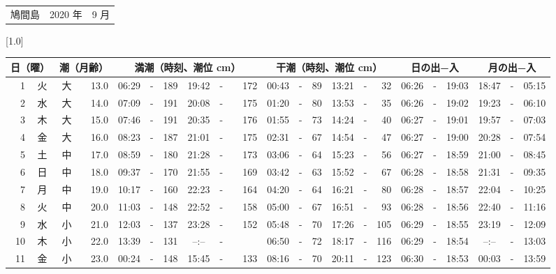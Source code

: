 \documentclass[12pt,a4j]{jsarticle}
\begin{document}
 \begin{table}[htbp]
 \begin{center}
 \begin{tabular}{lcc}
 \LARGE{鳩間島}  & \large{2020 年} & \large{ 9 月} \\
 \end{tabular}
 \end{center}
 \begin{center}
    \scalebox{0.7}[1.0]{
    \begin{tabular}{|rc|cr|ccrccr|ccrccr|ccc|ccc|}
    \hline
    \multicolumn{2}{|c|}{日（曜）} & \multicolumn{2}{c|}{潮（月齢）} & \multicolumn{6}{c|}{満潮（時刻、潮位 cm）} & \multicolumn{6}{c|}{干潮（時刻、潮位 cm）} & \multicolumn{3}{c|}{日の出−入} &  \multicolumn{3}{c|}{月の出−入}\\
 \hline
 1 & 火 & 大 & 13.0 &  06:29 &-& 189 &  19:42 &-& 172 &  00:43 &-&  89 &  13:21 &-&  32 & 06:26 & -& 19:03 & 18:47 & -& 05:15 \\
 2 & 水 & 大 & 14.0 &  07:09 &-& 191 &  20:08 &-& 175 &  01:20 &-&  80 &  13:53 &-&  35 & 06:26 & -& 19:02 & 19:23 & -& 06:10 \\
 3 & 木 & 大 & 15.0 &  07:46 &-& 191 &  20:35 &-& 176 &  01:55 &-&  73 &  14:24 &-&  40 & 06:27 & -& 19:01 & 19:57 & -& 07:03 \\
 4 & 金 & 大 & 16.0 &  08:23 &-& 187 &  21:01 &-& 175 &  02:31 &-&  67 &  14:54 &-&  47 & 06:27 & -& 19:00 & 20:28 & -& 07:54 \\
 5 & 土 & 中 & 17.0 &  08:59 &-& 180 &  21:28 &-& 173 &  03:06 &-&  64 &  15:23 &-&  56 & 06:27 & -& 18:59 & 21:00 & -& 08:45 \\
 6 & 日 & 中 & 18.0 &  09:37 &-& 170 &  21:55 &-& 169 &  03:42 &-&  63 &  15:52 &-&  67 & 06:28 & -& 18:58 & 21:31 & -& 09:35 \\
 7 & 月 & 中 & 19.0 &  10:17 &-& 160 &  22:23 &-& 164 &  04:20 &-&  64 &  16:21 &-&  80 & 06:28 & -& 18:57 & 22:04 & -& 10:25 \\
 8 & 火 & 中 & 20.0 &  11:03 &-& 148 &  22:52 &-& 158 &  05:00 &-&  67 &  16:51 &-&  93 & 06:28 & -& 18:56 & 22:40 & -& 11:16 \\
 9 & 水 & 小 & 21.0 &  12:03 &-& 137 &  23:28 &-& 152 &  05:48 &-&  70 &  17:26 &-& 105 & 06:29 & -& 18:55 & 23:19 & -& 12:09 \\
10 & 木 & 小 & 22.0 &  13:39 &-& 131 &  --:-- &-&~~~~~ &  06:50 &-&  72 &  18:17 &-& 116 & 06:29 & -& 18:54 & --:-- & -& 13:03 \\
11 & 金 & 小 & 23.0 &  00:24 &-& 148 &  15:45 &-& 133 &  08:16 &-&  70 &  20:11 &-& 123 & 06:30 & -& 18:53 & 00:03 & -& 13:59 \\

\end{tabular}}
\end{center}
\end{table}
\end{document}
